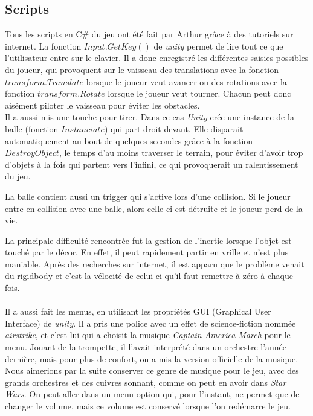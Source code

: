 \documentclass[10pt, titlepage]{report}
\begin{document}
\subsection{Scripts}
Tous les scripts en C\# du jeu ont été fait par Arthur grâce à des tutoriels sur internet. La fonction $Input.GetKey()$ de \textit{unity} permet de lire tout ce que l'utilisateur entre sur le clavier. Il a donc enregistré les différentes saisies possibles du joueur, qui provoquent sur le vaisseau des translations avec la fonction $transform.Translate$ lorsque le joueur veut avancer ou des rotations avec la fonction $transform.Rotate$ lorsque le joueur veut tourner. Chacun peut donc aisément piloter le vaisseau pour éviter les obstacles.\\

Il a aussi mis une touche pour tirer. Dans ce cas \textit{Unity} crée une instance de la balle (fonction $Instanciate$) qui part droit devant. Elle disparait automatiquement au bout de quelques secondes grâce à la fonction $DestroyObject$, le temps d'au moins traverser le terrain, pour éviter d'avoir trop d'objets à la fois qui partent vers l'infini, ce qui provoquerait un ralentissement du jeu.

La balle contient aussi un trigger qui s'active lors d'une collision. Si le joueur entre en collision avec une balle, alors celle-ci est détruite et le joueur perd de la vie.

La principale difficulté rencontrée fut la gestion de l'inertie lorsque l'objet est touché par le décor. En effet, il peut rapidement partir en vrille et n'est plus maniable. Après des recherches sur internet, il est apparu que le problème venait du rigidbody et c'est la vélocité de celui-ci qu'il faut remettre à zéro à chaque fois.\\ \\

 Il a aussi fait les menus, en utilisant les propriétés GUI (Graphical User Interface) de \textit{unity}. Il a pris une police avec un effet de science-fiction nommée \textit{airstrike}, et c'est lui qui a choisit la musique \textit{Captain America March} pour le menu. Jouant de la trompette, il l'avait interprété dans un orchestre l'année dernière, mais pour plus de confort, on a mis la version officielle de la musique. Nous aimerions par la suite conserver ce genre de musique pour le jeu, avec des grands orchestres et des cuivres sonnant, comme on peut en avoir dans \textit{Star Wars}. On peut aller dans un menu option qui, pour l'instant, ne permet que de changer le volume, mais ce volume est conservé lorsque l'on redémarre le jeu.
\end{document}
